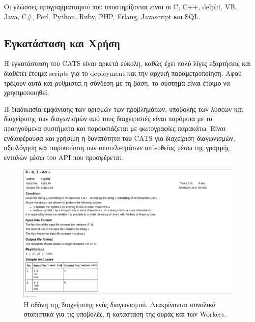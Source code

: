 \documentclass[diploma]{softlab-thesis}
\begin{document}


\bigskip

Οι γλώσσες προγραμματισμού που υποστηρίζονται είναι οι C, C++, delphi, VB, Java,
C\#, Perl, Python, Ruby, PHP, Erlang, Javascript και SQL.

\subsection{Εγκατάσταση και Χρήση}

Η εγκατάσταση του CATS είναι αρκετά εύκολη, καθώς έχει πολύ λίγες εξαρτήσεις
και διαθέτει έτοιμα scripts για το deployment και την αρχική παραμετροποίηση.
Αφού τρέξουν αυτά και ρυθμιστεί η σύνδεση με τη βάση, το σύστημα είναι έτοιμο
να χρησιμοποιηθεί.

\bigskip

Η διαδικασία εμφάνισης των ορισμών των προβλημάτων, υποβολής των λύσεων και
διαχείρισης των διαγωνισμών από τους διαχειριστές είναι παρόμοια με τα προηγούμενα
συστήματα και παρουσιάζεται με φωτογραφίες παρακάτω. Είναι ενδιαφέρουσα και χρήσιμη
η δυνατότητα του CATS για διαχείριση διαγωνισμών, αξιολόγηση και παρουσίαση των
αποτελεσμάτων απ᾽ευθείας μέσω της γραμμής εντολών μέσω του API που προσφέρεται.

\begin{figure}
  \centering
  \includegraphics[scale=0.3]{Figures/catsproblem.png}
  \caption[Οθόνη διαχείρισης προβλήματος]{Η οθόνη της διαχείρισης ενός διαγωνισμού.
  Διακρίνονται συνολικά στατιστικά για τις υποβολές, η κατάσταση της ουράς και των
  Workers.}
\end{figure}
\end{document}
